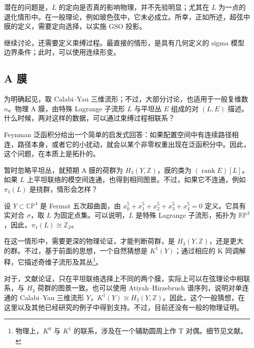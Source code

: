 潜在的问题是，$L$ 的定向是否真的影响物理，并不先验明显；尤其在 $L$ 为一点的退化情形中。在一般理论，例如玻色弦中，它未必成立。所幸，正如所述，超弦中膜的定义，需要定向选择，以实施 GSO 投影。

继续讨论，还需要定义束缚过程。最直接的情形，是具有几何定义的 sigma 模型边界条件；此时，可以使用连续形变。

\subsection{A 膜}\label{sec:5.1.2}

为明确起见，取 Calabi--Yau 三维流形；不过，大部分讨论，也适用于一般复维数 $n$。物理 A 膜，由特殊 Lagrange 子流形 $L$ 与平坦丛 $E$ 组成的对 $(L,E)$ 描述。什么时候，两对这样的数据，可以通过束缚过程相联系？

Feynman 泛函积分给出一个简单的启发式回答：如果配置空间中有连续路径相连，路径本身，或者它的小扰动，就会以某个非零权重出现在泛函积分中。因此，这个问题，在本质上是拓扑的。

暂时忽略平坦丛，就预期 A 膜的荷群为 $H_3(Y,\mathbb{Z})$，膜的类为 $(\operatorname{rank}E)[L]$。如果 $L$ 上平坦联络的模空间连通，也得到相同图景。不过，如果它不连通，例如 $\pi_1(L)$ 是挠群，情形会怎样？

\begin{example}\label{ex:5.3}
设 $Y\subset\mathbb{CP}^4$ 是 Fermat 五次超曲面，由 $x_0^5+x_1^5+x_2^5+x_3^5+x_4^5=0$ 定义。它具有实对合 $\sigma$，取 $L$ 为固定点集。可以说明，$L$ 是特殊 Lagrange 子流形，拓扑为 $\mathbb{RP}^3$，因此，$\pi_1(L)\cong\mathbb{Z}_2$。
\end{example}

在这一情形中，需要更深的物理论证，才能判断荷群，是 $H_3(Y,\mathbb{Z})$，还是更大的群。不过，基于前面的思想，一个自然猜想是 $K^1(Y)$；通过相应的 K 同调解释，它描述奇维子流形及其丛\footnote{物理上，$K^0$ 与 $K^1$ 的联系，涉及在一个辅助圆周上作 T 对偶。细节见文献。}。

对于，文献论证，只在平坦联络选择上不同的两个膜，实际上可以在弦理论中相联系，与 $H_3$ 荷群的图景一致。也可以使用 Atiyah--Hirzebruch 谱序列，说明对单连通的 Calabi--Yau 三维流形 $Y$，$K^1(Y)\cong H_3(Y,\mathbb{Z})$。因此，这个一般猜想，在这里以及其他已经研究的例子中得到支持。不过，目前还没有一般的物理证明。

